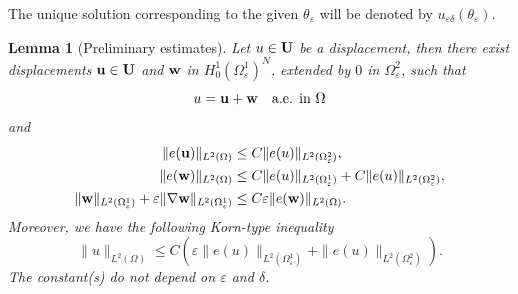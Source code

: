 \documentclass[11pt,a4paper]{article}
\numberwithin{equation}{section}
\def\O{\Omega}
\def\d{\delta}
\def\e{\varepsilon}
\def\Ga{{\bf a}}
\def\ed{{\varepsilon\delta}}
\def\Ga{{\bf a}}
\def\Gm{{\bf m}}
\def\Gu{{\bf u}}
\def\Gw{{\bf w}}
\def\GT{{\bf T}}
\def\GU{{\bf U}}
\newtheorem{lemma}[theorem]{Lemma}
\begin{document}
The unique solution corresponding to the given $\theta_\e$ will be denoted by $u_\ed(\theta_\e)$.
\begin{lemma}[Preliminary estimates]\label{L2}
	Let $u\in\GU$ be a displacement, then there exist displacements $\Gu\in\GU$ and $\Gw$ in $H^1_0(\O^1_\e)^N$, extended by $0$ in $\O^2_\e$,  such that
	\begin{equation}\label{ExRF}
		u=\Gu+\Gw\quad\text{a.e. in $\O$}
	\end{equation}
	and 
	\begin{equation}\label{46}
		\begin{aligned}
			\|e(\Gu)\|_{L^2(\O)}&\leq C\|e(u)\|_{L^2(\O_\e^2)},\\
			\|e(\Gw)\|_{ L^2(\O)}&\leq C\|e(u)\|_{L^2(\O^1_\e)}+C\|e(u)\|_{L^2(\O_\e^2)},\\
			\|\Gw\|_{L^2(\O^1_\e)}+\e\|\nabla \Gw\|_{L^2(\O^1_\e)} &\leq C\e\|e( \Gw)\|_{L^2(\O)}.
		\end{aligned}
	\end{equation}
	Moreover, we have the following Korn-type inequality
	\begin{equation}\label{NK01}
		\|u\|_{L^2(\O)}\leq C\left(\e\|e(u)\|_{L^2(\O^1_\e)}+\|e(u)\|_{L^2(\O^2_\e)}\right).
	\end{equation}
	The constant(s) do not depend on $\e$ and $\d$.
\end{lemma}
\end{document}
